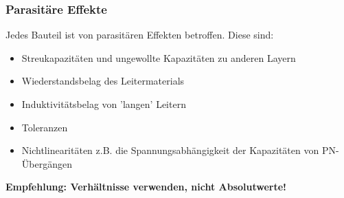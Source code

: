 

\subsubsection{Parasitäre Effekte}

Jedes Bauteil ist von parasitären Effekten betroffen. 
Diese sind:
\begin{itemize}
    \item Streukapazitäten und ungewollte Kapazitäten zu anderen Layern
    \item Wiederstandsbelag des Leitermaterials
    \item Induktivitätsbelag von 'langen' Leitern
    \item Toleranzen
    \item Nichtlinearitäten z.B. die Spannungsabhängigkeit der Kapazitäten von PN-Übergängen
\end{itemize}

\smallskip

\textbf{\rightarrow Empfehlung: Verhältnisse verwenden, nicht Absolutwerte!}


